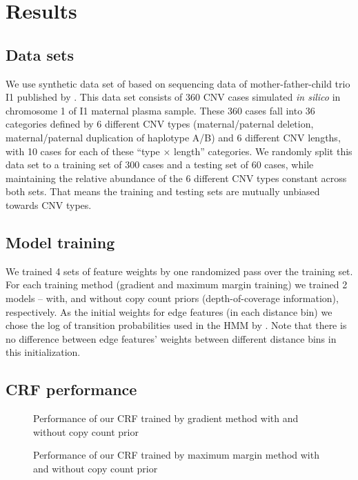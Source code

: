 \section{Results}

\subsection{Data sets}
We use synthetic data set of \cite{rampasek2014fcnv} based on sequencing data of mother-father-child trio I1 published by \cite{kitzman2012}. This data set consists of 360 CNV cases simulated \textit{in silico} in chromosome 1 of I1 maternal plasma sample. These 360 cases fall into 36 categories defined by 6 different CNV types (maternal/paternal deletion, maternal/paternal duplication of haplotype A/B) and 6 different CNV lengths, with 10 cases for each of these ``type $\times$ length'' categories. We randomly split this data set to a training set of 300 cases and a testing set of 60 cases, while maintaining the relative abundance of the 6 different CNV types constant across both sets. That means the training and testing sets are mutually unbiased towards CNV types.

\subsection{Model training}
We trained 4 sets of feature weights by one randomized pass over the training set. For each training method (gradient and maximum margin training) we trained 2 models -- with, and without copy count priors (depth-of-coverage information), respectively. As the initial weights for edge features (in each distance bin) we chose the log of transition probabilities used in the HMM by \cite{rampasek2014fcnv}. Note that there is no difference between edge features' weights between different distance bins in this initialization.

\subsection{CRF performance}
\begin{figure}
\caption{Performance of our CRF trained by gradient method with and without copy count prior}
\label{fig:CRFbyGM}
\centering
\end{figure}

\begin{figure}
\caption{Performance of our CRF trained by maximum margin method with and without copy count prior}
\label{fig:CRFbyMM}
\centering
\end{figure}

